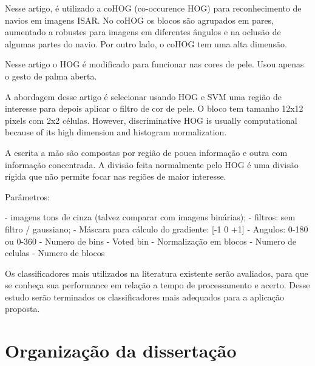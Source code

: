 Nesse artigo, é utilizado a coHOG (co-occurence HOG) para reconhecimento de navios em imagens ISAR. No coHOG os blocos são agrupados em pares, aumentado a robustes para imagens em diferentes ângulos e na oclusão  de algumas partes do navio. Por outro lado, o coHOG tem uma alta dimensão.

Nesse artigo o HOG é modificado para funcionar nas cores de pele. Usou apenas o gesto de palma aberta.	

A abordagem desse artigo é selecionar usando HOG e SVM uma região de interesse para depois aplicar o filtro de cor de pele. O bloco tem tamanho 12x12 pixels com 2x2 células.
However, discriminative HOG is usually computational because of its high dimension and histogram normalization.

A escrita a mão são compostas por região de pouca informação e outra com informação concentrada. A divisão feita normalmente pelo HOG é uma divisão rígida que não permite focar nas regiões de maior interesse.

Parâmetros:

- imagens tons de cinza (talvez comparar com imagens binárias);
- filtros: sem filtro / gaussiano;
- Máscara para cálculo do gradiente: [-1 0 +1]
- Angulos: 0-180 ou 0-360
- Numero de bins
- Voted bin
- Normalização em blocos
- Numero de celulas
- Numero de blocos

Os classificadores mais utilizados na literatura existente serão avaliados, para que se conheça sua performance em relação a tempo de processamento e acerto. Desse estudo serão terminados os classificadores mais adequados para a aplicação proposta.

\section{Organização da dissertação}


